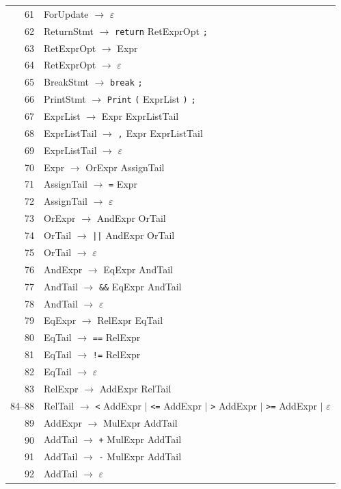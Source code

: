 \documentclass[12pt,a4paper]{article}
\begin{document}
\begin{longtable}{rp{11cm}}
61 & ForUpdate $\rightarrow$ $\varepsilon$ \\
62 & ReturnStmt $\rightarrow$ \texttt{return} RetExprOpt \texttt{;} \\
63 & RetExprOpt $\rightarrow$ Expr \\
64 & RetExprOpt $\rightarrow$ $\varepsilon$ \\
65 & BreakStmt $\rightarrow$ \texttt{break} \texttt{;} \\
66 & PrintStmt $\rightarrow$ \texttt{Print} \texttt{(} ExprList \texttt{)} \texttt{;} \\
67 & ExprList $\rightarrow$ Expr ExprListTail \\
68 & ExprListTail $\rightarrow$ \texttt{,} Expr ExprListTail \\
69 & ExprListTail $\rightarrow$ $\varepsilon$ \\
70 & Expr $\rightarrow$ OrExpr AssignTail \\
71 & AssignTail $\rightarrow$ \texttt{=} Expr \\
72 & AssignTail $\rightarrow$ $\varepsilon$ \\
73 & OrExpr $\rightarrow$ AndExpr OrTail \\
74 & OrTail $\rightarrow$ \texttt{||} AndExpr OrTail \\
75 & OrTail $\rightarrow$ $\varepsilon$ \\
76 & AndExpr $\rightarrow$ EqExpr AndTail \\
77 & AndTail $\rightarrow$ \texttt{\&\&} EqExpr AndTail \\
78 & AndTail $\rightarrow$ $\varepsilon$ \\
79 & EqExpr $\rightarrow$ RelExpr EqTail \\
80 & EqTail $\rightarrow$ \texttt{==} RelExpr \\
81 & EqTail $\rightarrow$ \texttt{!=} RelExpr \\
82 & EqTail $\rightarrow$ $\varepsilon$ \\
83 & RelExpr $\rightarrow$ AddExpr RelTail \\
84--88 & RelTail $\rightarrow$ \texttt{<} AddExpr $\mid$ \texttt{<=} AddExpr $\mid$ \texttt{>} AddExpr $\mid$ \texttt{>=} AddExpr $\mid$ $\varepsilon$ \\
89 & AddExpr $\rightarrow$ MulExpr AddTail \\
90 & AddTail $\rightarrow$ \texttt{+} MulExpr AddTail \\
91 & AddTail $\rightarrow$ \texttt{-} MulExpr AddTail \\
92 & AddTail $\rightarrow$ $\varepsilon$ \\

\end{longtable}
\end{document}
